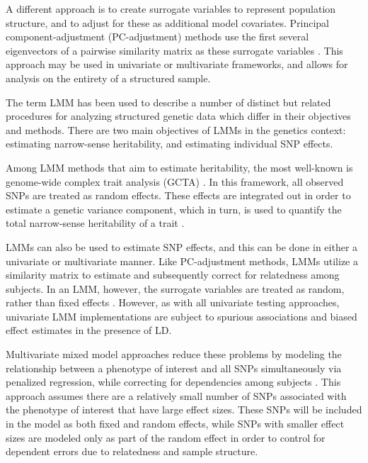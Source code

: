 A different approach is to create surrogate variables to represent population structure, and to adjust for these as additional model covariates. Principal component-adjustment (PC-adjustment) methods use the first several eigenvectors of a pairwise similarity matrix as these surrogate variables \citep{price2006principal}. This approach may be used in univariate or multivariate frameworks, and allows for analysis on the entirety of a structured sample. 

The term LMM has been used to describe a number of distinct but related procedures for analyzing structured genetic data which differ in their objectives and methods. There are two main objectives of LMMs in the genetics context: estimating narrow-sense heritability, and estimating individual SNP effects.

Among LMM methods that aim to estimate heritability, the most well-known is genome-wide complex trait analysis (GCTA) \citep{yang2011gcta}. In this framework, all observed SNPs are treated as random effects. These effects are integrated out in order to estimate a genetic variance component, which in turn, is used to quantify the total narrow-sense heritability of a trait \citep{yang2010common}.

LMMs can also be used to estimate SNP effects, and this can be done in either a univariate or multivariate manner. Like PC-adjustment methods, LMMs utilize a similarity matrix to estimate and subsequently correct for relatedness among subjects. In an LMM, however, the surrogate variables are treated as random, rather than fixed effects \citep{yu2006unified, kang2010variance, kang2008efficient}. However, as with all univariate testing approaches, univariate LMM implementations are subject to spurious associations and biased effect estimates in the presence of LD. 

Multivariate mixed model approaches reduce these problems by modeling the relationship between a phenotype of interest and all SNPs simultaneously via penalized regression, while correcting for dependencies among subjects \citep{rakitsch2013lasso, bhatnagar2020simultaneous}. This approach assumes there are a relatively small number of SNPs associated with the phenotype of interest that have large effect sizes. These SNPs will be included in the model as both fixed and random effects, while SNPs with smaller effect sizes are modeled only as part of the random effect in order to control for dependent errors due to relatedness and sample structure.

